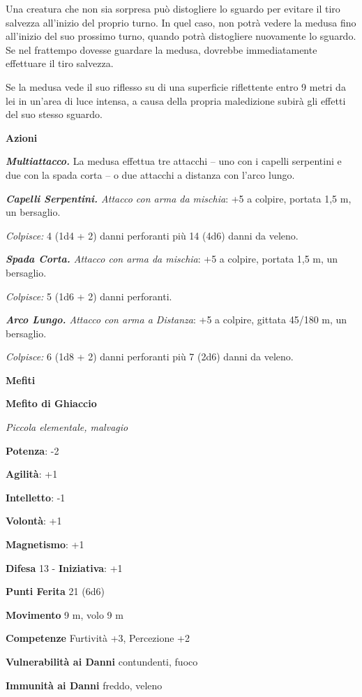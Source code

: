 \begin{multicols}{2}
Una creatura che non sia sorpresa può distogliere lo sguardo per evitare
il tiro salvezza all'inizio del proprio turno. In quel caso, non potrà
vedere la medusa fino all'inizio del suo prossimo turno, quando potrà
distogliere nuovamente lo sguardo. Se nel frattempo dovesse guardare la
medusa, dovrebbe immediatamente effettuare il tiro salvezza.

Se la medusa vede il suo riflesso su di una superficie riflettente entro
9 metri da lei in un'area di luce intensa, a causa della propria
maledizione subirà gli effetti del suo stesso sguardo.

\textbf{Azioni}

\emph{\textbf{Multiattacco.}} La medusa effettua tre attacchi -- uno con
i capelli serpentini e due con la spada corta -- o due attacchi a
distanza con l'arco lungo.

\emph{\textbf{Capelli Serpentini.} Attacco con arma da mischia}: +5 a
colpire, portata 1,5 m, un bersaglio.

\emph{Colpisce:} 4 (1d4 + 2) danni perforanti più 14 (4d6) danni da
veleno.

\emph{\textbf{Spada Corta.} Attacco con arma da mischia}: +5 a colpire,
portata 1,5 m, un bersaglio.

\emph{Colpisce:} 5 (1d6 + 2) danni perforanti.

\emph{\textbf{Arco Lungo.} Attacco con arma a Distanza}: +5 a colpire,
gittata 45/180 m, un bersaglio.

\emph{Colpisce:} 6 (1d8 + 2) danni perforanti più 7 (2d6) danni da
veleno.

\textbf{Mefiti}

\textbf{Mefito di Ghiaccio}

\emph{Piccola elementale, malvagio}

\textbf{Potenza}: -2

\textbf{Agilità}: +1

\textbf{Intelletto}: -1

\textbf{Volontà}: +1

\textbf{Magnetismo}: +1

\textbf{Difesa} 13 - \textbf{Iniziativa}: +1

\textbf{Punti Ferita} 21 (6d6)

\textbf{Movimento} 9 m, volo 9 m

\textbf{Competenze} Furtività +3, Percezione +2

\textbf{Vulnerabilità ai Danni} contundenti, fuoco

\textbf{Immunità ai Danni} freddo, veleno


\end{multicols}
